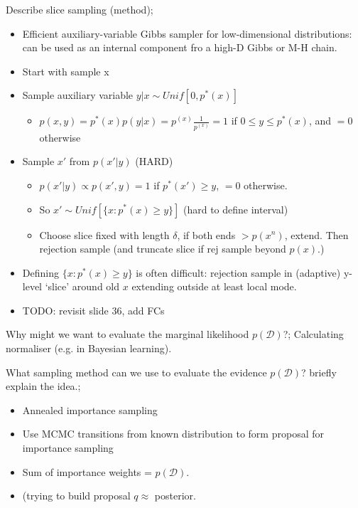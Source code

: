 \documentclass{article}
\begin{document}
Describe slice sampling (method); \begin{itemize}
    \item Efficient auxiliary-variable Gibbs sampler for low-dimensional distributions: can be used as an internal component fro a high-D Gibbs or M-H chain.
    \item Start with sample x
    \item Sample auxiliary variable $y|x \sim Unif[0, p^*(x)]$
    \begin{itemize}
        \item $p(x, y) = p^*(x)p(y|x) = p^(x)\frac{1}{p^(x)}=1$ if $0\leq y \leq p^*(x)$, and $=0$ otherwise
    \end{itemize}
    \item Sample $x'$ from $p(x'|y)$ (HARD)
    \begin{itemize}
        \item $p(x'|y) \propto p(x',y) = 1$ if $p^*(x') \geq y$, $=0$ otherwise.
        \item So $x' \sim Unif[\{x: p^*(x) \geq y\} ]$ (hard to define interval)
        \item Choose slice fixed with length $\delta$, if both ends $> p(x^n)$, extend. Then rejection sample (and truncate slice if rej sample beyond $p(x)$.)
    \end{itemize}
    \item Defining $\{x:p^*(x)\geq y \}$ is often difficult: rejection sample in (adaptive) y-level `slice' around old $x$ extending outside at least local mode.
    \item TODO: revisit slide 36, add FCs
\end{itemize}


Why might we want to evaluate the marginal likelihood $p(\mathcal{D})$?; Calculating normaliser (e.g. in Bayesian learning).

What sampling method can we use to evaluate the evidence $p(\mathcal{D})$? briefly explain the idea.; \begin{itemize}
    \item Annealed importance sampling
    \item Use MCMC transitions from known distribution to form proposal for importance sampling
    \item Sum of importance weights = $p(\mathcal{D})$.
    \item (trying to build proposal $q\approx$ posterior.
\end{itemize}
\end{document}
